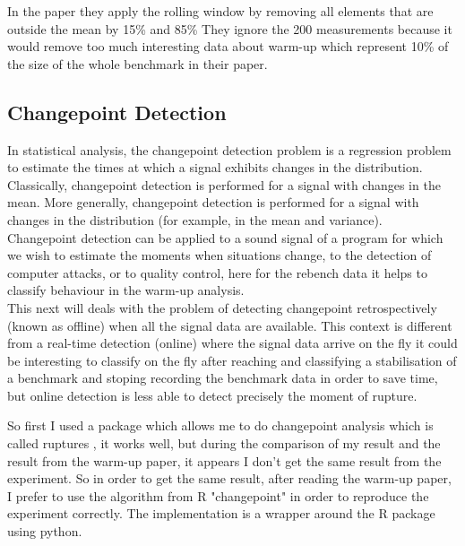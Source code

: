 \documentclass{article}
\begin{document}
In the paper they apply the rolling window by removing all elements that are outside the mean by 15\% and 85\% They ignore the 200 measurements because it would remove too much interesting data about warm-up which represent 10\% of the size of the whole benchmark in their paper.


\subsection{Changepoint Detection}
In statistical analysis,  the changepoint detection problem is a regression problem to estimate the times at which a signal exhibits changes in the distribution. Classically, changepoint detection is performed for a signal with changes in the mean. More generally, changepoint detection is performed for a signal with changes in the distribution (for example, in the mean and variance). \\

Changepoint detection can be applied to a sound signal of a program for which we wish to estimate the moments when situations change, to the detection of computer attacks, or to quality control, here for the rebench data it helps to classify behaviour in the warm-up analysis. \\

This next will deals with the problem of detecting changepoint retrospectively (known as offline) when all the signal data are available. This context is different from a real-time detection (online) where the signal data arrive on the fly it could be interesting to classify on the fly after reaching and classifying a stabilisation of a benchmark and stoping recording the benchmark data in order to save time, but online detection is less able to detect precisely the moment of rupture.

So first I used a package which allows me to do changepoint analysis which is called ruptures \citep{truong2020selective}, it works well, but during the comparison of my result and the result from the warm-up paper, it appears I don't get the same result from the experiment. So in order to get the same result, after reading the warm-up paper, I prefer to use the algorithm from R "changepoint" \citep{killick2014changepoint} in order to reproduce the experiment correctly. The implementation is a wrapper around the R package using python. 
\end{document}
